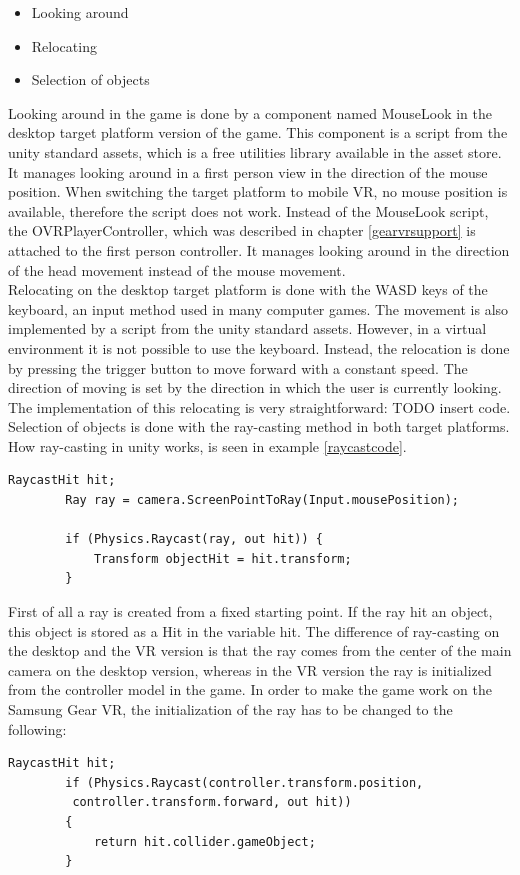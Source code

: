 \begin{itemize}
\item Looking around
\item Relocating
\item Selection of objects
\end{itemize}
Looking around in the game is done by a component named MouseLook in the desktop target platform version of the game. This component is a script from the unity standard assets, which is a free utilities library available in the asset store. It manages looking around in a first person view in the direction of the mouse position. When switching the target platform to mobile VR, no mouse position is available, therefore the script does not work. Instead of the MouseLook script, the OVRPlayerController, which was described in chapter \ref{gearvrsupport} is attached to the first person controller. It manages looking around in the direction of the head movement instead of the mouse movement.\\
Relocating on the desktop target platform is done with the WASD keys of the keyboard, an input method used in many computer games. The movement is also implemented by a script from the unity standard assets. However, in a virtual environment it is not possible to use the keyboard. Instead, the relocation is done by pressing the trigger button to move forward with a constant speed. The direction of moving is set by the direction in which the user is currently looking. The implementation of this relocating is very straightforward: TODO insert code.\\
Selection of objects is done with the ray-casting method in both target platforms. How ray-casting in unity works, is seen in example \ref{raycastcode}. 
\begin{lstlisting} 
RaycastHit hit;
        Ray ray = camera.ScreenPointToRay(Input.mousePosition);
        
        if (Physics.Raycast(ray, out hit)) {
            Transform objectHit = hit.transform;
        }
\end{lstlisting}
\label{raycastcode}
First of all a ray is created from a fixed starting point. If the ray hit an object, this object is stored as a Hit in the variable hit. The difference of ray-casting on the desktop and the VR version is that the ray comes from the center of the main camera on the desktop version, whereas in the VR version the ray is initialized from the controller model in the game. In order to make the game work on the Samsung Gear VR, the initialization of the ray has to be changed to the following:
\begin{lstlisting} 
RaycastHit hit;
        if (Physics.Raycast(controller.transform.position,
         controller.transform.forward, out hit))
        {
            return hit.collider.gameObject;
        }
\end{lstlisting}


